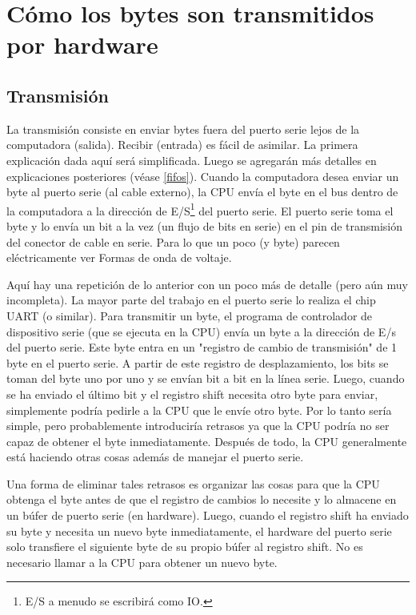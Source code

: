 \documentclass[11pt, twosides, titlepage]{article}
\begin{document}
\section{Cómo los bytes son transmitidos por hardware}

    \subsection{Transmisión}

        La transmisión consiste en enviar bytes fuera del puerto serie lejos de la 
        computadora (salida). Recibir (entrada) es fácil de asimilar. La primera 
        explicación dada aquí será simplificada. Luego se agregarán más detalles en 
        explicaciones posteriores (véase \ref{fifos}). Cuando la computadora desea enviar 
        un byte al puerto serie (al cable externo), la CPU envía el byte en el bus dentro 
        de la computadora a la dirección de E/S\footnote{
            E/S a menudo se escribirá como IO.
        } del puerto serie. El puerto serie toma el byte y lo envía un bit a la vez 
        (un flujo de bits en serie) en el pin de transmisión del conector de cable en 
        serie. Para lo que un poco (y byte) parecen eléctricamente ver Formas de onda de 
        voltaje.

        Aquí hay una repetición de lo anterior con un poco más de detalle (pero aún muy 
        incompleta). La mayor parte del trabajo en el puerto serie lo realiza el chip 
        UART (o similar). Para transmitir un byte, el programa de controlador de 
        dispositivo serie (que se ejecuta en la CPU) envía un byte a la dirección de E/s 
        del puerto serie. Este byte entra en un "registro de cambio de transmisión" de 1 
        byte en el puerto serie. A partir de este registro de desplazamiento, los bits se 
        toman del byte uno por uno y se envían bit a bit en la línea serie. Luego, cuando 
        se ha enviado el último bit y el registro shift necesita otro byte para enviar, 
        simplemente podría pedirle a la CPU que le envíe otro byte. Por lo tanto sería 
        simple, pero probablemente introduciría retrasos ya que la CPU podría no ser capaz 
        de obtener el byte inmediatamente. Después de todo, la CPU generalmente está 
        haciendo otras cosas además de manejar el puerto serie.
        
        Una forma de eliminar tales retrasos es organizar las cosas para que la CPU 
        obtenga el byte antes de que el registro de cambios lo necesite y lo almacene en 
        un búfer de puerto serie (en hardware). Luego, cuando el registro shift ha enviado 
        su byte y necesita un nuevo byte inmediatamente, el hardware del puerto serie solo 
        transfiere el siguiente byte de su propio búfer al registro shift. No es necesario 
        llamar a la CPU para obtener un nuevo byte.
\end{document}
